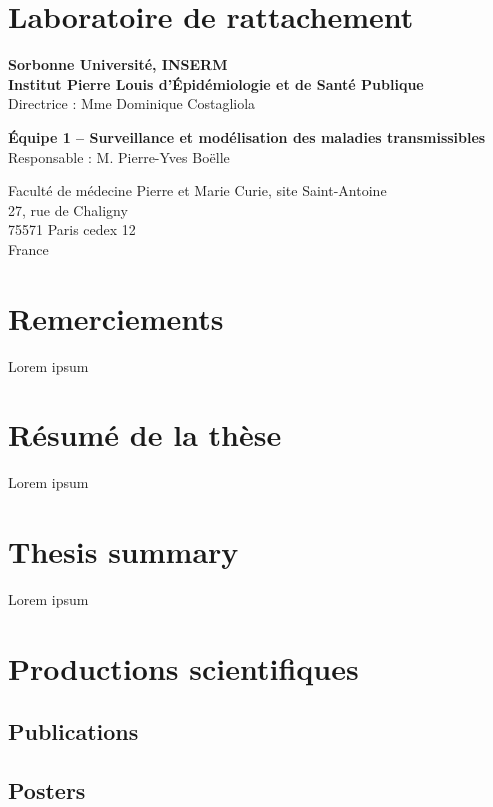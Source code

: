 
\clearpage
\clearpage
\section*{Laboratoire de rattachement}
\vspace{2em}

\begin{center}
{\bf Sorbonne Université, INSERM \\ 
Institut Pierre Louis d’Épidémiologie et de Santé Publique} \\
Directrice : Mme Dominique Costagliola

\vspace{2em}
{\bf Équipe 1 -- Surveillance et modélisation des maladies transmissibles} \\
Responsable : M. Pierre-Yves Boëlle

\vspace{2em}
Faculté de médecine Pierre et Marie Curie, site Saint-Antoine \\
27, rue de Chaligny \\
75571 Paris cedex 12 \\
France
\end{center}

\clearpage
\section*{Remerciements}
\vspace{2em}

Lorem ipsum

\clearpage
\section*{Résumé de la thèse}
\vspace{2em}

Lorem ipsum

\clearpage
\section*{Thesis summary}
\vspace{2em}

Lorem ipsum

\clearpage
\section*{Productions scientifiques}
\vspace{2em}

\subsection*{Publications}

\subsection*{Posters}





